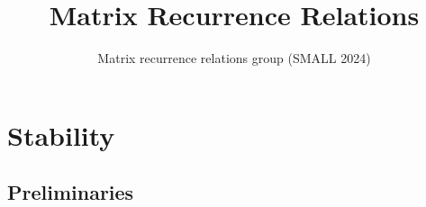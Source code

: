 \documentclass[12pt]{amsart}
\title{Matrix Recurrence Relations}
\author{Matrix recurrence relations group (SMALL 2024)}
\begin{document}
\maketitle
\section{Stability}

\subsection{Preliminaries}
\end{document}
